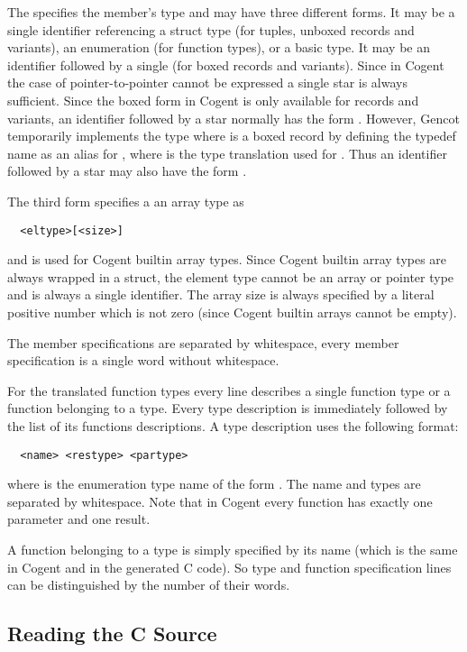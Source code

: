The  specifies the member's type and may have three different forms. It may be a single 
identifier referencing a struct type (for tuples, unboxed records and variants), an enumeration 
(for function types), or a basic type. It may be an identifier followed by a single  
(for boxed records and variants). Since in Cogent the case of pointer-to-pointer cannot be expressed
a single star is always sufficient. Since the boxed form in Cogent is only available for records and
variants, an identifier followed by a star normally has the form . However, Gencot temporarily implements
the type  where  is a boxed record by defining the typedef name 
as an alias for , where  is the type translation used for . Thus an 
identifier followed by a star may also have the form .

The third form specifies a an array type as
\begin{verbatim}
  <eltype>[<size>]
\end{verbatim}
and is used for Cogent builtin array types. Since Cogent builtin array types are always wrapped in a
struct, the element type  cannot be an array or pointer type and is always a single identifier. 
The array size  is always specified by a literal positive number which is not zero (since 
Cogent builtin arrays cannot be empty).

The member specifications are separated by whitespace, every member specification is a single word
without whitespace. 

For the translated function types every line describes a single function type or a function belonging 
to a type. Every type description is immediately followed by the list of its functions descriptions.
A type description uses the following format:
\begin{verbatim}
  <name> <restype> <partype>
\end{verbatim}
where  is the enumeration type name of the form . The name and types are
separated by whitespace. Note that in Cogent every function has exactly one parameter and one result. 

A function belonging to 
a type is simply specified by its name (which is the same in Cogent and in the generated C code).
So type and function specification lines can be distinguished by the number of their words.

\subsection{Reading the C Source}
\label{impl-ctypinfo-read}

